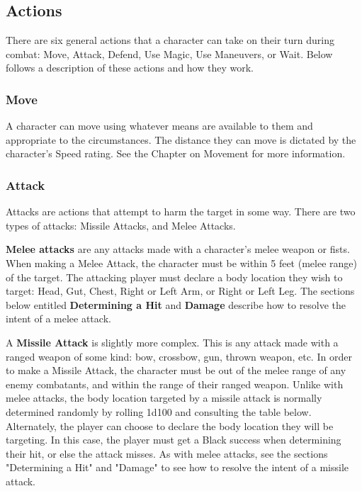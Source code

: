 \documentclass[oneside]{book}
\begin{document}
\begin{multicols}{2}
\section{Actions}
There are six general actions that a character can take on their turn during combat: Move, Attack, Defend, Use Magic, Use Maneuvers, or Wait. Below follows a description of these actions and how they work. 

\subsubsection{Move}
A character can move using whatever means are available to them and appropriate to the circumstances. The distance they can move is dictated by the character's Speed rating. See the Chapter on Movement for more information.

\subsubsection{Attack}
Attacks are actions that attempt to harm the target in some way. There are two types of attacks: Missile Attacks, and Melee Attacks.

\textbf{Melee attacks} are any attacks made with a character's melee weapon or fists. When making a Melee Attack, the character must be within 5 feet (melee range) of the target. The attacking player must declare a body location they wish to target: Head, Gut, Chest, Right or Left Arm, or Right or Left Leg. The sections below entitled \textbf{Determining a Hit} and \textbf{Damage} describe how to resolve the intent of a melee attack. 

A \textbf{Missile Attack} is slightly more complex. This is any attack made with a ranged weapon of some kind: bow, crossbow, gun, thrown weapon, etc. In order to make a Missile Attack, the character must be  out of the melee range of any enemy combatants, and within the range of their ranged weapon. Unlike with melee attacks, the body location targeted by a missile attack is normally determined randomly by rolling 1d100 and consulting the table below. Alternately, the player can choose to declare the body location they will be targeting. In this case, the player must get a Black success when determining their hit, or else the attack misses. As with melee attacks, see the sections "Determining a Hit" and "Damage" to see how to resolve the intent of a missile attack. 



\end{multicols}
\end{document}
